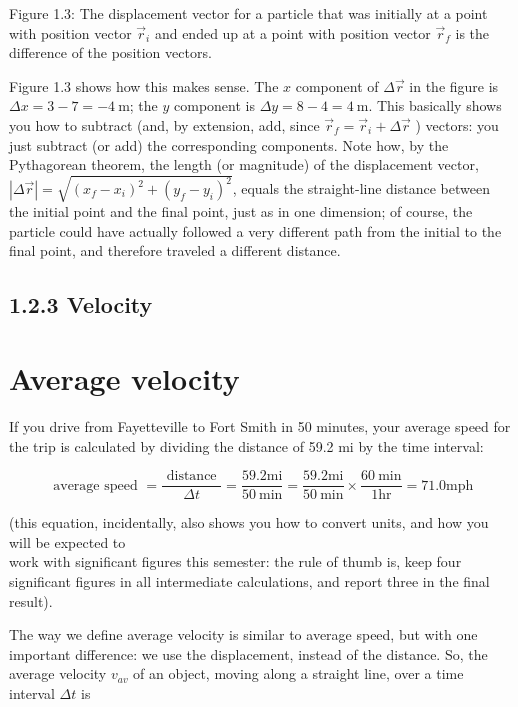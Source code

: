\documentclass[10pt]{article}
\begin{document}
Figure 1.3: The displacement vector for a particle that was initially at a point with position vector $\vec{r}_{i}$ and ended up at a point with position vector $\vec{r}_{f}$ is the difference of the position vectors.

Figure 1.3 shows how this makes sense. The $x$ component of $\Delta \vec{r}$ in the figure is $\Delta x=3-7=-4 \mathrm{~m}$; the $y$ component is $\Delta y=8-4=4 \mathrm{~m}$. This basically shows you how to subtract (and, by extension, add, since $\vec{r}_{f}=\vec{r}_{i}+\Delta \vec{r}$ ) vectors: you just subtract (or add) the corresponding components. Note how, by the Pythagorean theorem, the length (or magnitude) of the displacement vector, $|\Delta \vec{r}|=\sqrt{\left(x_{f}-x_{i}\right)^{2}+\left(y_{f}-y_{i}\right)^{2}}$, equals the straight-line distance between the initial point and the final point, just as in one dimension; of course, the particle could have actually followed a very different path from the initial to the final point, and therefore traveled a different distance.

\subsection*{1.2.3 Velocity}
\section*{Average velocity}
If you drive from Fayetteville to Fort Smith in 50 minutes, your average speed for the trip is calculated by dividing the distance of 59.2 mi by the time interval:


\begin{equation*}
\text { average speed }=\frac{\text { distance }}{\Delta t}=\frac{59.2 \mathrm{mi}}{50 \mathrm{~min}}=\frac{59.2 \mathrm{mi}}{50 \mathrm{~min}} \times \frac{60 \mathrm{~min}}{1 \mathrm{hr}}=71.0 \mathrm{mph} \tag{1.5}
\end{equation*}


(this equation, incidentally, also shows you how to convert units, and how you will be expected to\\
work with significant figures this semester: the rule of thumb is, keep four significant figures in all intermediate calculations, and report three in the final result).

The way we define average velocity is similar to average speed, but with one important difference: we use the displacement, instead of the distance. So, the average velocity $v_{a v}$ of an object, moving along a straight line, over a time interval $\Delta t$ is
\end{document}
